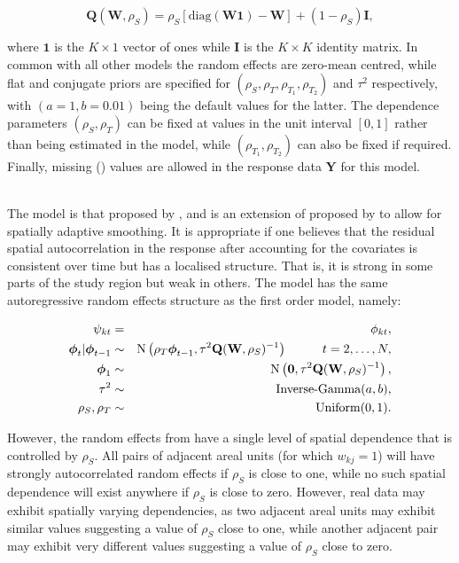 \documentclass[article, nojss]{jss}
\newcommand{\bd}[1]{\ensuremath{\mbox{\boldmath $#1$}}}
\begin{document}
\begin{equation}
\mathbf{Q}(\mathbf{W},\rho_S)=\rho_S[\mbox{diag}(\mathbf{W}\mathbf{1}) - \mathbf{W}] + (1-\rho_S)\mathbf{I},\label{Lerouxjoint}
\end{equation}

where $\mathbf{1}$ is the $K\times 1$ vector of ones while $\mathbf{I}$ is the $K\times K$ identity matrix. In common with all other models the random effects are zero-mean centred, while flat and conjugate priors are specified for $(\rho_S, \rho_T, \rho_{T_1}, \rho_{T_2})$ and $\tau^2$ respectively, with $(a=1, b=0.01)$ being the default values for the latter. The  dependence parameters $(\rho_{S}, \rho_{T})$ can be fixed at values in the unit interval $[0,1]$ rather than being estimated in the model, while $(\rho_{T_1}, \rho_{T_2})$ can also be fixed if required. Finally, missing () values are allowed in the response data $\mathbf{Y}$ for this model.\vspace{1cm}


\\
The model is that proposed by \cite{rushworth2016}, and is an extension of  proposed by \cite{rushworth2014} to allow for spatially adaptive smoothing. It is appropriate if one believes that the residual spatial autocorrelation in the response after accounting for the covariates is consistent over time but has a localised structure. That is, it is strong in some parts of the study region but weak in others. The model has the same autoregressive random effects structure as the first order   model, namely:

\begin{eqnarray}
\psi_{kt}&=&\phi_{kt},\label{caradaptive1}\\
\bd{\phi}_t|\bd{\phi}_{t-1} & \sim & \mbox{N}\left(\rho_T\bd{\phi}_{t-1}, \tau^{2} \mathbf{Q}(\mathbf{W},\rho_S)^{-1}\right)\hspace{1cm} t=2,\ldots,N,\nonumber\\
\bd{\phi}_1 & \sim & \mbox{N}\left(\mathbf{0}, \tau^{2} \mathbf{Q}(\mathbf{W},\rho_S)^{-1}\right),\nonumber\\
\tau^2&\sim&\mbox{Inverse-Gamma}(a,b),\nonumber\\
\rho_S,\rho_T&\sim&\mbox{Uniform}(0,1).\nonumber
\end{eqnarray}


However, the random effects from   have a single level of spatial dependence that is controlled by $\rho_S$. All pairs of adjacent areal units (for which $w_{kj}=1$) will have strongly autocorrelated random effects if $\rho_S$ is close to one, while no such spatial dependence will exist anywhere if $\rho_S$ is close to zero. However, real data may exhibit spatially varying dependencies, as two adjacent areal units may exhibit similar values suggesting a value of $\rho_S$ close to one, while another adjacent pair may exhibit very different values suggesting a value of $\rho_S$ close to zero.
\end{document}
